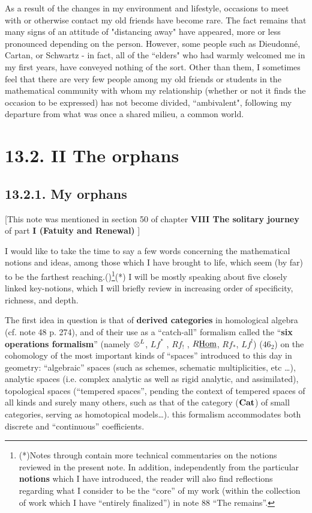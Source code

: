  As a result of the changes in my environment and lifestyle, occasions to meet with or otherwise contact my old friends have become rare. The fact remains that many signs of an attitude of "distancing away" have appeared, more or less pronounced depending on the person. However, some people such as Dieudonn\'e, Cartan, or Schwartz - in fact, all of the ``elders" who had warmly welcomed me in my first years, have conveyed nothing of the sort. Other than them, I sometimes feel that there are very few people among my old friends or students in the mathematical community with whom my relationship (whether or not it finds the occasion to be expressed) has not become divided, ``ambivalent", following my departure from what was once a shared milieu, a common world.

\section{13.2. II The orphans}

\subsection{13.2.1. My orphans}

\label{note:46}
[This note was mentioned in section 50 of chapter \textbf{VIII The solitary journey} of
part \textbf{I (Fatuity and Renewal)}
]

I would like to take the time to say a few words concerning the mathematical notions and
ideas, among those which I have brought to life, which seem (by far) to be the farthest
reaching.()\footnote{(*)Notes \no {} through 
 contain more technical
commentaries on the notions reviewed in the present note. In addition, independently from
the particular \textbf{notions} which I have introduced, the reader will also find reflections
regarding what I consider to be the ``core'' of my work (within the collection of work
which I have ``entirely finalized'') in note \no $88$ ``The remains''.}(*)
I will be mostly speaking about five closely linked key-notions, 
which I will briefly review in increasing order of specificity, richness, and depth.

The first idea in question is that of \textbf{derived categories} in homological algebra
(cf. note 48 p. 274), and of their use as a ``catch-all'' formalism called the 
``\textbf{six operations formalism}''
(namely $\otimes^L$, $Lf^*$ , $Rf_!$ , $R\underline{\operatorname{Hom}}$, $Rf_*$, $Lf^!$)
($46_2$) on the cohomology of the most important kinds of ``spaces'' introduced to this
day in geometry: ``algebraic'' spaces (such as schemes, schematic
multiplicities, etc \ldots), analytic spaces (i.e. complex analytic as well as
rigid analytic, and assimilated), topological spaces (``tempered spaces'', pending the context
of tempered spaces of all kinds and surely many others, such as that of the category
($\mathbf{Cat}$) of small categories, serving as homotopical models\ldots).
this formalism accommodates both discrete and ``continuous'' coefficients.

